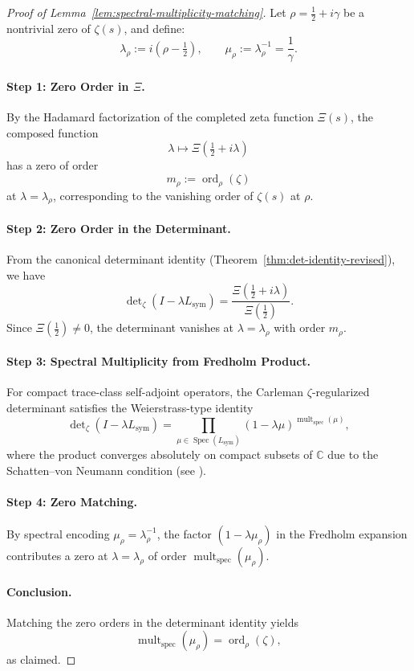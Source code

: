 \begin{proof}[Proof of Lemma~\ref{lem:spectral-multiplicity-matching}]
Let \( \rho = \tfrac{1}{2} + i\gamma \) be a nontrivial zero of \( \zeta(s) \), and define:
\[
\lambda_\rho := i(\rho - \tfrac{1}{2}), \qquad \mu_\rho := \lambda_\rho^{-1} = \frac{1}{\gamma}.
\]

\paragraph{Step 1: Zero Order in \texorpdfstring{\( \Xi \)}{Ξ}.}
By the Hadamard factorization of the completed zeta function \( \Xi(s) \), the composed function
\[
\lambda \mapsto \Xi\left( \tfrac{1}{2} + i\lambda \right)
\]
has a zero of order
\[
m_\rho := \operatorname{ord}_\rho(\zeta)
\]
at \( \lambda = \lambda_\rho \), corresponding to the vanishing order of \( \zeta(s) \) at \( \rho \).

\paragraph{Step 2: Zero Order in the Determinant.}
From the canonical determinant identity (Theorem~\ref{thm:det-identity-revised}), we have
\[
\det\nolimits_\zeta(I - \lambda L_{\mathrm{sym}}) = \frac{\Xi(\tfrac{1}{2} + i\lambda)}{\Xi(\tfrac{1}{2})}.
\]
Since \( \Xi(\tfrac{1}{2}) \neq 0 \), the determinant vanishes at \( \lambda = \lambda_\rho \) with order \( m_\rho \).

\paragraph{Step 3: Spectral Multiplicity from Fredholm Product.}
For compact trace-class self-adjoint operators, the Carleman \(\zeta\)-regularized determinant satisfies the Weierstrass-type identity
\[
\det\nolimits_\zeta(I - \lambda L_{\mathrm{sym}})
= \prod_{\mu \in \operatorname{Spec}(L_{\mathrm{sym}})} (1 - \lambda \mu)^{\operatorname{mult}_{\mathrm{spec}}(\mu)},
\]
where the product converges absolutely on compact subsets of \( \mathbb{C} \) due to the Schatten–von Neumann condition (see \cite[Theorem 4.2]{Simon2005TraceIdeals}).

\paragraph{Step 4: Zero Matching.}
By spectral encoding \( \mu_\rho = \lambda_\rho^{-1} \), the factor \( (1 - \lambda \mu_\rho) \) in the Fredholm expansion contributes a zero at \( \lambda = \lambda_\rho \) of order \( \operatorname{mult}_{\mathrm{spec}}(\mu_\rho) \).

\paragraph{Conclusion.}
Matching the zero orders in the determinant identity yields
\[
\operatorname{mult}_{\mathrm{spec}}(\mu_\rho) = \operatorname{ord}_\rho(\zeta),
\]
as claimed.
\end{proof}
% 